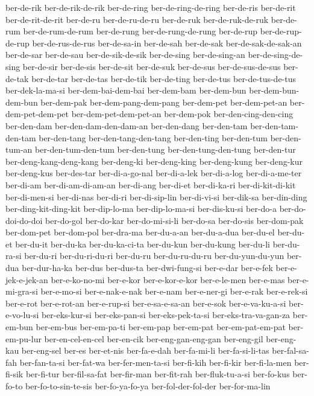 {ber-de-rik ber-de-rik-de-rik ber-de-ring ber-de-ring-de-ring ber-de-ris
ber-de-rit ber-de-rit-de-rit ber-de-ru ber-de-ru-de-ru ber-de-ruk
ber-de-ruk-de-ruk ber-de-rum ber-de-rum-de-rum ber-de-rung
ber-de-rung-de-rung ber-de-rup ber-de-rup-de-rup ber-de-rus-de-rus
ber-de-sa-in ber-de-sah ber-de-sak ber-de-sak-de-sak-an ber-de-sar
ber-de-sau ber-de-sik-de-sik ber-de-sing ber-de-sing-an
ber-de-sing-de-sing ber-de-sir ber-de-sis ber-de-sit ber-de-suk ber-de-sus
ber-de-sus-de-sus ber-de-tak ber-de-tar ber-de-tas ber-de-tik ber-de-ting
ber-de-tus ber-de-tus-de-tus ber-dek-la-ma-si ber-dem-bai-dem-bai
ber-dem-bam ber-dem-bun ber-dem-bun-dem-bun ber-dem-pak
ber-dem-pang-dem-pang ber-dem-pet ber-dem-pet-an ber-dem-pet-dem-pet
ber-dem-pet-dem-pet-an ber-dem-pok ber-den-cing-den-cing ber-den-dam
ber-den-dam-den-dam-an ber-den-dang ber-den-tam ber-den-tam-den-tam
ber-den-tang ber-den-tang-den-tang ber-den-ting ber-den-tum ber-den-tum-an
ber-den-tum-den-tum ber-den-tung ber-den-tung-den-tung ber-den-tur
ber-deng-kang-deng-kang ber-deng-ki ber-deng-king ber-deng-kung
ber-deng-kur ber-deng-kus ber-des-tar ber-di-a-go-nal ber-di-a-lek
ber-di-a-log ber-di-a-me-ter ber-di-am ber-di-am-di-am-an ber-di-ang
ber-di-et ber-di-ka-ri ber-di-kit-di-kit ber-di-men-si ber-di-nas
ber-di-ri ber-di-sip-lin ber-di-vi-si ber-dik-sa ber-din-ding
ber-ding-kit-ding-kit ber-dip-lo-ma ber-dip-lo-ma-si ber-dis-ku-si
ber-do-a ber-do-doi-do-doi ber-do-gol ber-do-kar ber-do-mi-si-li ber-do-sa
ber-do-sis ber-dom-pak ber-dom-pet ber-dom-pol ber-dra-ma ber-du-a-an
ber-du-a-dua ber-du-el ber-du-et ber-du-it ber-du-ka ber-du-ka-ci-ta
ber-du-kun ber-du-kung ber-du-li ber-du-ra-si ber-du-ri ber-du-ri-du-ri
ber-du-ru ber-du-ru-du-ru ber-du-yun-du-yun ber-dua ber-dur-ha-ka ber-dus
ber-dus-ta ber-dwi-fung-si ber-e-dar ber-e-fek ber-e-jek-e-jek-an
ber-e-ko-no-mi ber-e-kor ber-e-kor-e-kor ber-e-le-men ber-e-mas
ber-e-mi-gra-si ber-e-mo-si ber-e-nak-e-nak ber-e-nam ber-e-ner-gi
ber-e-rak ber-e-rek-si ber-e-rot ber-e-rot-an ber-e-rup-si
ber-e-sa-e-sa-an ber-e-sok ber-e-va-ku-a-si ber-e-vo-lu-si ber-eks-kur-si
ber-eks-pan-si ber-eks-pek-ta-si ber-eks-tra-va-gan-za ber-em-bun
ber-em-bus ber-em-pa-ti ber-em-pap ber-em-pat ber-em-pat-em-pat
ber-em-pu-lur ber-en-cel-en-cel ber-en-cik ber-eng-gan-eng-gan ber-eng-gil
ber-eng-kau ber-eng-sel ber-es ber-et-nis ber-fa-e-dah ber-fa-mi-li
ber-fa-si-li-tas ber-fal-sa-fah ber-fan-ta-si ber-fat-wa ber-fer-men-ta-si
ber-fi-kih ber-fi-kir ber-fi-la-men ber-fi-sik ber-fi-tur ber-fil-sa-fat
ber-fir-man ber-fit-rah ber-fluk-tu-a-si ber-fo-kus ber-fo-to
ber-fo-to-sin-te-sis ber-fo-ya-fo-ya ber-fol-der-fol-der ber-for-ma-lin
}
